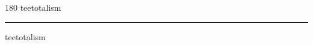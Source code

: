 
\begin{frame}
\begin{center}
\begin{turn}{180}
{\fontsize{2.5cm}{1em}\selectfont teetotalism}
\end{turn}
\vspace{1em}\par  
\hrule
\vspace{1em}\par  
{\fontsize{2.5cm}{1em}\selectfont teetotalism}
\end{center}
\end{frame}
